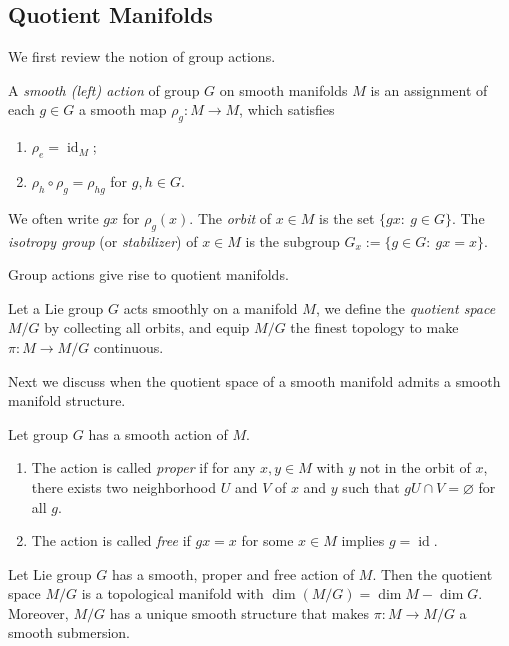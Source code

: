 \subsection*{Quotient Manifolds}

We first review the notion of group actions.
\begin{defn}
    A \emph{smooth (left) action} of group $G$ on smooth manifolds $M$ is an assignment of each $g\in G$ a smooth map $\rho_g:M\to M$, which satisfies
    \begin{enumerate}[(1)]
        \item $\rho_e=\operatorname{id}_M$;
        \item $\rho_h\circ\rho_g=\rho_{hg}$ for $g,h\in G$.
    \end{enumerate}
    We often write $gx$ for $\rho_g(x)$.
    The \emph{orbit} of $x\in M$ is the set $\{gx:\ g\in G\}$.
    The \emph{isotropy group} (or \emph{stabilizer}) of $x\in M$ is the subgroup $G_x:=\{g\in G:\ gx=x\}$.
\end{defn}

Group actions give rise to quotient manifolds.
\begin{defn}
    Let a Lie group $G$ acts smoothly on a manifold $M$, we define the \emph{quotient space} $M/G$ by collecting all orbits, and equip $M/G$ the finest topology to make $\pi:M\to M/G$ continuous.
\end{defn}

Next we discuss when the quotient space of a smooth manifold admits a smooth manifold structure.
\begin{defn}Let group $G$ has a smooth action of $M$.
    \begin{enumerate}[(1)]
        \item The action is called \emph{proper} if for any $x,y\in M$ with $y$ not in the orbit of $x$, there exists two neighborhood $U$ and $V$ of $x$ and $y$ such that $gU\cap V=\varnothing$ for all $g$.
        \item The action is called \emph{free} if $gx=x$ for some $x\in M$ implies $g=\operatorname{id}$.
    \end{enumerate}
\end{defn}

\begin{thm}
    Let Lie group $G$ has a smooth, proper and free action of $M$.
    Then the quotient space $M/G$ is a topological manifold with $\dim(M/G)=\dim{M}-\dim{G}$.
    Moreover, $M/G$ has a unique smooth structure that makes $\pi:M\to M/G$ a smooth submersion.
\end{thm}

